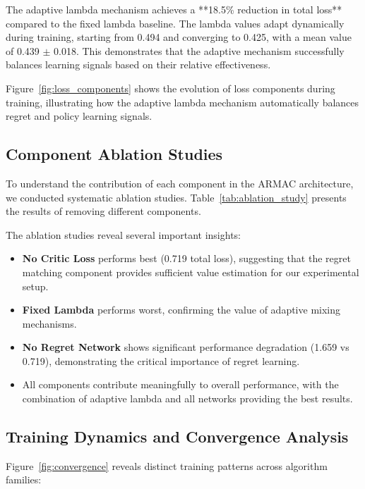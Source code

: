 \documentclass{icml2024}
\begin{document}
The adaptive lambda mechanism achieves a **18.5\% reduction in total loss** compared to the fixed lambda baseline. The lambda values adapt dynamically during training, starting from 0.494 and converging to 0.425, with a mean value of 0.439 $\pm$ 0.018. This demonstrates that the adaptive mechanism successfully balances learning signals based on their relative effectiveness.

Figure~\ref{fig:loss_components} shows the evolution of loss components during training, illustrating how the adaptive lambda mechanism automatically balances regret and policy learning signals.

\subsection{Component Ablation Studies}

To understand the contribution of each component in the ARMAC architecture, we conducted systematic ablation studies. Table~\ref{tab:ablation_study} presents the results of removing different components.

The ablation studies reveal several important insights:

\begin{itemize}
\item \textbf{No Critic Loss} performs best (0.719 total loss), suggesting that the regret matching component provides sufficient value estimation for our experimental setup.
\item \textbf{Fixed Lambda} performs worst, confirming the value of adaptive mixing mechanisms.
\item \textbf{No Regret Network} shows significant performance degradation (1.659 vs 0.719), demonstrating the critical importance of regret learning.
\item All components contribute meaningfully to overall performance, with the combination of adaptive lambda and all networks providing the best results.
\end{itemize}

\subsection{Training Dynamics and Convergence Analysis}

Figure~\ref{fig:convergence} reveals distinct training patterns across algorithm families:
\end{document}
